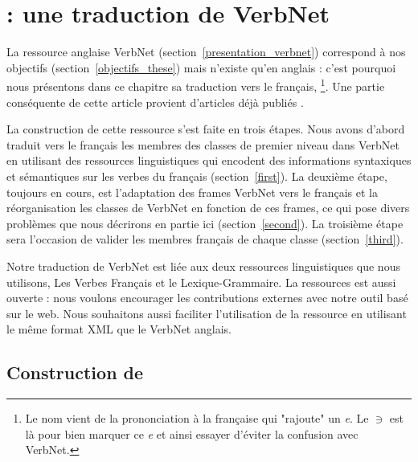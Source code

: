 \chapter{\verbenet{} : une traduction de VerbNet}
\label{ch:verbnet}

La ressource anglaise VerbNet (section~\ref{presentation_verbnet}) correspond à
nos objectifs (section~\ref{objectifs_these}) mais n'existe qu'en anglais :
c'est pourquoi nous présentons dans ce chapitre sa traduction vers le français,
\verbenet{}\footnote{Le nom vient de la prononciation à la française qui
"rajoute" un \emph{e}. Le $\ni$ est là pour bien marquer ce \emph{e} et ainsi
essayer d'éviter la confusion avec VerbNet.}. Une partie conséquente de cette
article provient d'articles déjà publiés
\citep{danlos2014vers,pradet2014adapting}.

La construction de cette ressource s'est faite en trois étapes. Nous avons
d'abord traduit vers le français les membres des classes de premier niveau dans
VerbNet en utilisant des ressources linguistiques qui encodent des informations
syntaxiques et sémantiques sur les verbes du français (section~\ref{first}). La
deuxième étape, toujours en cours, est l'adaptation des frames VerbNet vers le
français et la réorganisation les classes de VerbNet en fonction de ces frames,
ce qui pose divers problèmes que nous décrirons en partie ici
(section~\ref{second}). La troisième étape sera l'occasion de valider les
membres français de chaque classe (section~\ref{third}).

Notre traduction de VerbNet est liée aux deux ressources linguistiques que nous
utilisons, Les Verbes Français et le Lexique-Grammaire. La ressources est aussi
ouverte : nous voulons encourager les contributions externes avec notre outil
basé sur le web. Nous souhaitons aussi faciliter l'utilisation de la ressource
en utilisant le même format XML que le VerbNet anglais.

\section{Construction de \verbenet{}}

